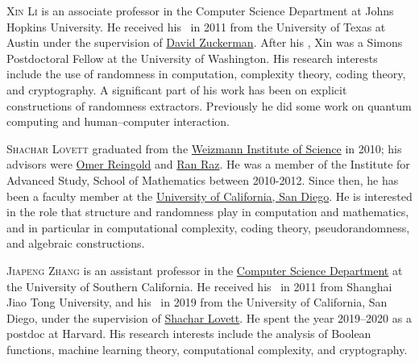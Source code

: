 \documentclass{toc}
\begin{document}
\begin{tocaboutauthors}
\begin{tocabout}[Li] 
\textsc{Xin Li} is an associate professor in the Computer Science
Department at Johns Hopkins University.
He received his \phd\ in 2011 from the University of Texas at Austin
under the supervision of
\href{https://www.cs.utexas.edu/~diz/}{David Zuckerman}.
%
%
%
After his \phd,
Xin was a Simons Postdoctoral Fellow at the University of Washington.
His research interests include the use of randomness in computation,
complexity theory, coding theory, and cryptography. A significant
part of his work has been on explicit constructions of randomness extractors.
Previously
%
 he did some work on quantum computing and human--computer
interaction.
\end{tocabout}
\begin{tocabout}[Lovett] 
\textsc{Shachar Lovett} graduated from the
\href{https://www.weizmann.ac.il/}{Weizmann Institute of Science}
in 2010; his advisors were
\href{https://omereingold.wordpress.com/}{Omer Reingold} and
\href{https://www.cs.princeton.edu/people/profile/ranr}{Ran Raz}.
He was a member of the Institute for Advanced Study,
School of Mathematics between 2010-2012. Since then, he has been
a faculty member at the
\href{http://www.ucsd.edu}{University of California, San Diego}.
He is interested in the role that structure and randomness play in
computation and mathematics, and in particular in computational
complexity, coding theory, pseudorandomness,
and algebraic constructions.
\end{tocabout}
\begin{tocabout}[Zhang]  
\textsc{Jiapeng Zhang}  is an assistant professor in the 
\href{https://www.cs.usc.edu}{Computer Science Department} 
at the University of Southern California.  He received
his \bsc\ in 2011 from Shanghai Jiao Tong University, and his \phd\
in 2019 from the University of California, San Diego,
under the supervision of \href{http://cseweb.ucsd.edu/~slovett}{Shachar Lovett}.
He spent the year 2019--2020 as a postdoc at Harvard.
His research interests include the analysis of
Boolean functions, machine learning theory,
computational complexity, and cryptography.
%
\end{tocabout}
\end{tocaboutauthors}
\end{document}
